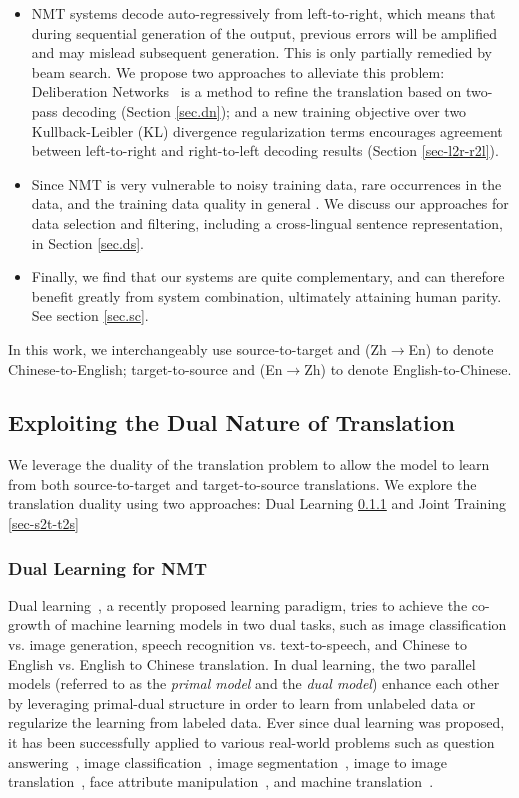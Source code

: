 \documentclass[a4paper]{article}
\begin{document}
\begin{CJK*}{UTF8}{gbsn}
\begin{itemize}
\item NMT systems decode auto-regressively from left-to-right, which means that during sequential generation of the output, previous errors will be amplified and may mislead subsequent generation. This is only partially remedied by beam search. We propose two approaches to alleviate this problem: Deliberation Networks~\cite{delibnet} is a method to refine the translation based on two-pass decoding (Section \ref{sec.dn}); and a new training objective over two Kullback-Leibler (KL) divergence regularization terms encourages agreement between left-to-right and right-to-left decoding results (Section \ref{sec-l2r-r2l}). 

\item Since NMT is very vulnerable to noisy training data, rare occurrences in the data, and the training data quality in general \cite{noisyNMT}. We discuss our approaches for data selection and filtering, including a cross-lingual sentence representation, in Section \ref{sec.ds}. 

\item Finally, we find that our systems are quite complementary, and can therefore benefit greatly from system combination, ultimately attaining human parity. See section \ref{sec.sc}.
\end{itemize}

In this work, we interchangeably use source-to-target and (Zh$\rightarrow$En) to denote Chinese-to-English; target-to-source and (En$\rightarrow$Zh) to denote English-to-Chinese. \subsection{Exploiting the Dual Nature of Translation}
\label{sec.duality}
We leverage  the duality of the translation problem to allow the model to learn from both source-to-target and target-to-source translations. We explore the translation duality using two approaches: Dual Learning \ref{sec.dl} and Joint Training \ref{sec-s2t-t2s}
\subsubsection{Dual Learning for NMT}
\label{sec.dl}
Dual learning~\cite{dualNMT,DSL,dualInfer}, a recently proposed learning paradigm, tries to achieve the co-growth of machine learning models in two dual tasks, such as image classification vs. image generation, speech recognition vs. text-to-speech, and Chinese to English vs. English to Chinese translation. In dual learning, the two parallel models (referred to as the \emph{primal model} and the \emph{dual model}) enhance each other by leveraging primal-dual structure in order to learn from unlabeled data or regularize the learning from labeled data. Ever since dual learning was proposed, it has been successfully applied to various real-world problems such as question answering~\cite{tang2017question}, image classification~\cite{DSL}, image segmentation~\cite{deepdual}, image to image translation~\cite{dualgan,cyclegan,cdgan}, face attribute manipulation~\cite{face}, and machine translation~\cite{dualNMT,wang2018dt,unsupervisedNMT,artetxe2018unsupervised}.


\end{CJK*}
\end{document}
